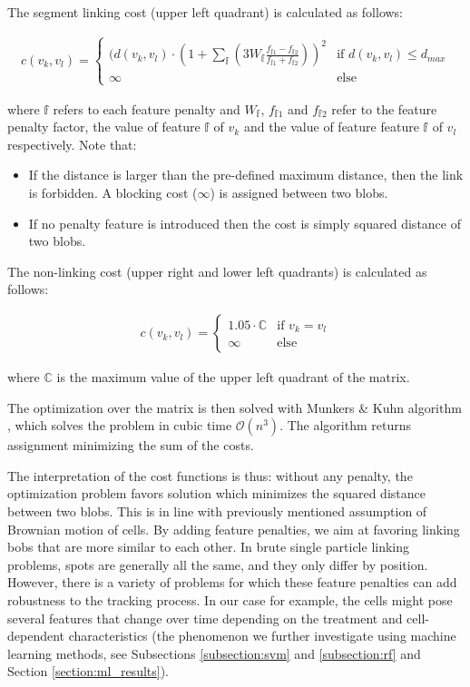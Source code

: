 \documentclass[pdftex,12pt,a4paper]{report}
\begin{document}
The segment linking cost (upper left quadrant) is calculated as follows:

\begin{gather*}
c(v_k, v_l) =
\begin{cases}
  (d(v_k, v_l) \cdot \left(1 + \sum_{\mathbb{f}} \left(3 W_{\mathbb{f}} \frac{ f_{\mathbb{f}1} - f_{\mathbb{f}2} }{f_{\mathbb{f}1} + f_{\mathbb{f}2}} \right)\right)^2 & \text{if } d(v_k, v_l) \leq d_{max} \\    
  \infty & \text{else}  
\end{cases}
\end{gather*}

where $\mathbb{f}$ refers to each feature penalty and $W_{\mathbb{f}}$, $f_{\mathbb{f}1}$ and $f_{\mathbb{f}2}$ refer to the feature penalty factor, the value of feature $\mathbb{f}$ of $v_k$ and the value of feature feature $\mathbb{f}$ of $v_l$ respectively. Note that:

\begin{itemize}
\item If the distance is larger than the pre-defined maximum distance, then the link is forbidden. A blocking cost ($\infty$) is assigned between two blobs.
\item If no penalty feature is introduced then the cost is simply squared distance of two blobs.
\end{itemize}

The non-linking cost (upper right and lower left quadrants) is calculated as follows:

\begin{gather*}
c(v_k, v_l) =
\begin{cases}
  1.05 \cdot \mathbb{C} & \text{if } v_k = v_l \\
  \infty & \text{else}  
\end{cases}
\end{gather*}

where $\mathbb{C}$ is the maximum value of the upper left quadrant of the matrix.

The optimization over the matrix is then solved with Munkers \& Kuhn algorithm \cite{munkres1957algorithms}, which solves the problem in cubic time $\mathcal{O}(n^3)$. The algorithm returns assignment minimizing the sum of the costs.

The interpretation of the cost functions is thus: without any penalty, the optimization problem favors solution which minimizes the squared distance between two blobs. This is in line with previously mentioned assumption of Brownian motion of cells. By adding feature penalties, we aim at favoring linking bobs that are more similar to each other. In brute single particle linking problems, spots are generally all the same, and they only differ by position. However, there is a variety of problems for which these feature penalties can add robustness to the tracking process. In our case for example, the cells might pose several features that change over time depending on the treatment and cell-dependent characteristics (the phenomenon we further investigate using machine learning methods, see Subsections \ref{subsection:svm} and \ref{subsection:rf} and Section \ref{section:ml_results}).
\end{document}
